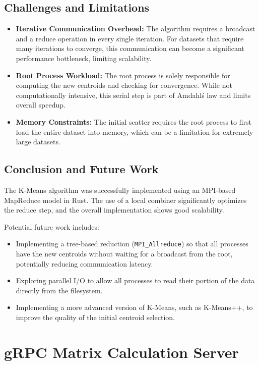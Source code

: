 \documentclass{article}
\begin{document}
\subsection{Challenges and Limitations}
\begin{itemize}
    \item \textbf{Iterative Communication Overhead:} The algorithm requires a broadcast and a reduce operation in every single iteration. For datasets that require many iterations to converge, this communication can become a significant performance bottleneck, limiting scalability.
    \item \textbf{Root Process Workload:} The root process is solely responsible for computing the new centroids and checking for convergence. While not computationally intensive, this serial step is part of Amdahl\'s law and limits overall speedup.
    \item \textbf{Memory Constraints:} The initial scatter requires the root process to first load the entire dataset into memory, which can be a limitation for extremely large datasets.
\end{itemize}

\subsection{Conclusion and Future Work}
The K-Means algorithm was successfully implemented using an MPI-based MapReduce model in Rust. The use of a local combiner significantly optimizes the reduce step, and the overall implementation shows good scalability.

Potential future work includes:
\begin{itemize}
    \item Implementing a tree-based reduction (\texttt{MPI\_Allreduce}) so that all processes have the new centroids without waiting for a broadcast from the root, potentially reducing communication latency.
    \item Exploring parallel I/O to allow all processes to read their portion of the data directly from the filesystem.
    \item Implementing a more advanced version of K-Means, such as K-Means++, to improve the quality of the initial centroid selection.
\end{itemize}

\section{gRPC Matrix Calculation Server}
\end{document}
